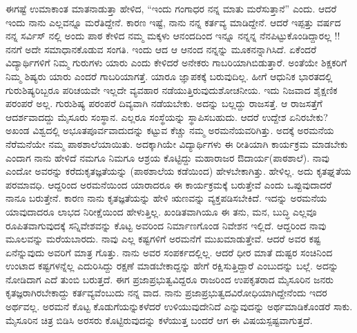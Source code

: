 {ಈಗಷ್ಟೆ ಉಮಾಕಾಂತ ಮಾತನಾಡುತ್ತಾ ಹೇಳಿದ, “ಇಂದು ಗಂಗಾಧರ ನನ್ನ ಮಾತು ಮರೆಸುತ್ತಾನೆ” ಎಂದು. ಆದರೆ ಇಂದು ನಾನು ಎಲ್ಲವನ್ನೂ ಮರೆತಿದ್ದೇನೆ. ಕಾರಣ ಇಷ್ಟೆ, ನಾನು ನನ್ನ ಕರ್ತವ್ಯ ಮಾಡಿದ್ದೇನೆ. ಆದರೆ ಇಪ್ಪತ್ತು ವರ್ಷದ ನನ್ನ ಸರ್ವಿಸ್ ನಲ್ಲಿ ಅಂದು ಪಾಠ ಕೇಳಿದ ನಮ್ಮ ಮಕ್ಕಳು ಆನಂದದಿಂದ ಇನ್ನೂ ನನ್ನನ್ನ ನೆನಪಿಟ್ಟುಕೊಂಡಿದ್ದಾರಲ್ಲ !! ನನಗೆ ಅದೇ ಸಮಾಧಾನಕೊಡುವ ಸಂಗತಿ. ಇಂದು ಆದ ಆ ಆನಂದ ನನ್ನನ್ನು ಮೂಕನನ್ನಾಗಿಸಿದೆ. ಏಕೆಂದರೆ ವಿದ್ಯಾರ್ಥಿಗಳಿಗೆ ನಿಮ್ಮ ಗುರುಗಳು ಯಾರು ಎಂದು ಕೇಳಿದರೆ ಅನೇಕರು ಗಾಬರಿಯಾಗಿಬಿಡುತ್ತಾರೆ. ಅಂತೆಯೇ ಶಿಕ್ಷಕರಿಗೆ ನಿಮ್ಮ ಶಿಷ್ಯರು ಯಾರು ಎಂದರೆ ಗಾಬರಿಯಾಗತ್ತೆ. ಯಾರೂ ಜ್ಞಾಪಕಕ್ಕೆ ಬರುವುದಿಲ್ಲ. ಹೀಗೆ ಆಧುನಿಕ ಭಾರತ\-ದಲ್ಲಿ ಗುರುಶಿಷ್ಯರಿಬ್ಬರೂ ಪರಿಚಯವೇ ಇಲ್ಲದೇ ವ್ಯವಹಾರ ನಡೆಯುತ್ತಿರುವುದು\break ಶೋಚನೀಯ. ಇದು ನಿಜವಾದ ಶೈಕ್ಷಣಿಕ ಪರಂಪರೆ ಅಲ್ಲ. ಗುರುಶಿಷ್ಯ ಪರಂಪರೆ ದಿವ್ಯ\-ವಾಗಿ ನಡೆಯಬೇಕು. ಅದನ್ನು ಬಲ್ಲದ್ದು ರಾಜಸತ್ತೆ. ಆ ರಾಜಸತ್ತೆಗೆ ಆದರ್ಶ\-ವಾದದ್ದು ಮೈಸೂರು ಸಂಸ್ಥಾನ. ಎಲ್ಲರೂ ಸಂಸ್ಥೆಯನ್ನು ಸ್ಥಾಪಿಸಬಹುದು. ಆದರೆ ಉದ್ದೇಶ ಏನಿರ\-ಬೇಕು? ಅಖಂಡ ವಿಶ್ವದಲ್ಲಿ ಅಭೂತಪೂರ್ವವಾದುದನ್ನು ಕಟ್ಟುವ ಕೆಚ್ಚು ನಮ್ಮ ಅರಮನೆ\-ಯವರಿಗಿತ್ತು. ಅದಕ್ಕೆ  ಅರಮನೆಯ ನೆರೆಮನೆಯೇ ನಮ್ಮ ಪಾಠಶಾಲೆ\-ಯಾಯಿತು. ಅದಕ್ಕಾಗಿಯೇ ವಿದ್ಯಾರ್ಥಿಗಳು ಈ ರೀತಿಯಾಗಿ ಕಾರ್ಯಕ್ರಮ ಮಾಡಬೇಕು ಎಂದಾಗ ನಾನು ಹೇಳಿದೆ \enginline{-} ನಮಗೂ ನಿಮಗೂ ಆಶ್ರಯ ಕೊಟ್ಟಿದ್ದು ಮಹಾರಾಜರ ಔದಾರ್ಯ(ಪಾಠಶಾಲೆ). ನಾವು ಎಂದೋ ಅವರನ್ನು ಕರೆದು\break ಕೃತಜ್ಞತೆಯನ್ನು (ಪಾಠಶಾಲೆಯ ಕಡೆಯಿಂದ) ಹೇಳಬೇಕಾಗಿತ್ತು. ಹೇಳಿಲ್ಲ. ಅದು ಕೃತಘ್ನತೆಯ ಪರಮಾವಧಿ. ಆದ್ದರಿಂದ ಅರಮನೆಯಿಂದ ಯಾರಾದರೂ ಈ ಕಾರ್ಯಕ್ರಮಕ್ಕೆ ಬರುತ್ತೇವೆ ಎಂದು ಒಪ್ಪುವುದಾದರೆ ನಾನೂ ಬರುತ್ತೇನೆ. ಕಾರಣ ನಾನು ಕೃತಜ್ಞತೆಯನ್ನು ಹೇಳಿ ಋಣವನ್ನು ವ್ಯಕ್ತಪಡಿಸಬೇಕಿದೆ. ಇದನ್ನು \hbox{ಅರಮನೆಯ} ಯಾವುದಾದರೂ \hbox{ಲಾಭದ} ನಿರೀಕ್ಷೆಯಿಂದ ಹೇಳುತ್ತಿಲ್ಲ. ಖಂಡಿತವಾಗಿಯೂ ಈ ತನು, ಮನ, ಬುದ್ಧಿ ಎಲ್ಲವೂ ರೂಪಿತವಾಗುವುದಕ್ಕೆ ಸನ್ನಿವೇಶವನ್ನು ಕೊಟ್ಟ ಅವರಿಂದ ನಿರ್ಮಾಣಗೊಂಡ ನಿವೇಶನ ಇಲ್ಲಿದೆ. ಆದ್ದರಿಂದ ನಾವು ಮೂಲವನ್ನು ಮರೆಯ\-ಬಾರದು. ನಾವು ಎಲ್ಲ \hbox{ಕಷ್ಟಗಳಿಗೆ} ಅರಮನೆಗೆ ಮುಖಮಾಡುತ್ತೇವೆ. ಆದರೆ ಅವರ ಕಷ್ಟ ಏನೆನ್ನುವುದು ಅವರಿಗೆ ಮಾತ್ರ ಗೊತ್ತು. ನಾನು ಅವರ ಸಂಪರ್ಕದಲ್ಲಿಲ್ಲ. ಆದರೆ ಧೀರ ಮಾತೆ ದುಷ್ಟರ \hbox{ಸಂಚಿನಿಂದ} ಉಂಟಾದ ಕಷ್ಟಗಳನ್ನೆಲ್ಲ ಎದುರಿಸಿದ್ದು  ರಕ್ಷಣೆ ಮಾಡಬೇಕಾದ್ದನ್ನು ಹೇಗೆ ರಕ್ಷಿಸುತ್ತಿದ್ದಾರೆ ಎಂಬುದನ್ನು ಬಲ್ಲೆ. ಅದನ್ನು ನೋಡಿದಾಗ ಎದೆ ತುಂಬಿ ಬರುತ್ತದೆ. ಈಗ ಪ್ರಜಾಪ್ರಭುತ್ವವಿದ್ದರೂ ರಾಜರಿಂದ ಉಪಕೃತರಾದ  ಮೈಸೂರಿನ ಜನರು ಕೃತಜ್ಞರಾಗಿರಬೇಕಾದ್ದು ಕರ್ತವ್ಯವೆಂಬುದು ನನ್ನ ವಾದ. ನಾನು ಪ್ರಜಾಪ್ರಭುತ್ವದ\break ವಿರೋಧಿಯಾಗಿದ್ದೇನೆಂದು  ಇದರ ಅರ್ಥವಲ್ಲ. ಅರಮನೆ ಕೊಟ್ಟ ಕೊಡುಗೆಯನ್ನು\break ಕಳೆದರೆ ಉಳಿಯುವುದೇನಿದೆ ಎನ್ನುವುದನ್ನು  ಅರ್ಥಮಾಡಿಕೊಂಡರೆ ಸಾಕು. ಮೈಸೂರಿನ ಚಿತ್ರ ಬಿಡಿಸಿ ಅರಸರು ಕೊಟ್ಟಿರುವುದನ್ನು ಕಳೆಯುತ್ತ ಬಂದರೆ ಆಗ ಈ ವಿಷಯ\break ಸ್ಪಷ್ಟ\-ವಾಗುತ್ತದೆ. 

}
